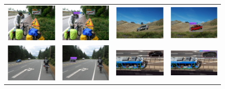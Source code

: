 \documentclass[10pt,twocolumn,letterpaper]{article}
\begin{document}
\begin{figure}[h]
\setlength\tabcolsep{1pt}
\centering
\begin{tabular}{|cc|cc|}
  \hline
  \includegraphics[width=0.24\linewidth]{supp/occlusion1.png} &
  \includegraphics[width=0.24\linewidth]{supp/occlusion1b.png} & 
  \includegraphics[width=0.24\linewidth]{supp/pas_car1a.png} &
  \includegraphics[width=0.24\linewidth]{supp/pas_car1b.png}  \\
  \includegraphics[width=0.24\linewidth]{supp/pas_car3a.png} &
  \includegraphics[width=0.24\linewidth]{supp/pas_car3b.png} & 
  \includegraphics[width=0.24\linewidth]{supp/pas_car5a.png} &
  \includegraphics[width=0.24\linewidth]{supp/pas_car5b.png}  \\

\end{tabular}
\end{figure}
\end{document}
